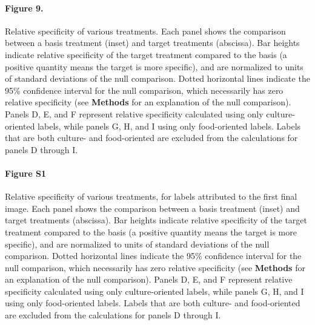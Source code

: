 \documentclass[a4paper]{report}
\begin{document}
\paragraph{Figure 9.}
Relative specificity of various treatments.
Each panel shows the comparison between a basis treatment (inset) and 
target treatments (abscissa).
Bar heights indicate relative specificity of the target 
treatment compared to the basis (a positive quantity means the target 
is more specific), and are normalized to units of standard 
deviations of the null comparison.  Dotted horizontal lines indicate
the 95\% confidence interval for the null comparison, which necessarily
has zero relative specificity (see \textbf{Methods} 
for an explanation of the null comparison).  Panels D, E, and F 
represent relative specificity calculated using only culture-oriented
labels, while panels G, H, and I using only food-oriented labels.
Labels that are both culture- and food-oriented are excluded from the
calculations for panels D through I.

\paragraph{Figure S1}
Relative specificity of various treatments, for labels attributed
to the first final image.
Each panel shows the comparison between a basis treatment (inset) and 
target treatments (abscissa).
Bar heights indicate relative specificity of the target 
treatment compared to the basis (a positive quantity means the target 
is more specific), and are normalized to units of standard 
deviations of the null comparison.  Dotted horizontal lines indicate
the 95\% confidence interval for the null comparison, which necessarily
has zero relative specificity (see \textbf{Methods} 
for an explanation of the null comparison).  Panels D, E, and F 
represent relative specificity calculated using only culture-oriented
labels, while panels G, H, and I using only food-oriented labels.
Labels that are both culture- and food-oriented are excluded from the
calculations for panels D through I.
\end{document}
